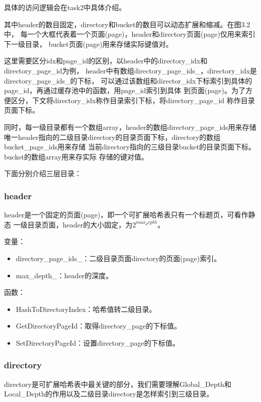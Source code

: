 \documentclass[a4paper]{article}
\begin{document}
具体的访问逻辑会在task2中具体介绍。

其中header的数目固定，directory和bucket的数目可以动态扩展和缩减。在图3.2中，
每一个大框代表着一个页面(page)，header和directory页面(page)仅用来索引下一级目录，
bucket页面(page)用来存储实际键值对。

这里需要区分idx和page\_id的区别，以header中的directory\_idx和directory\_page\_id为例，
header中有数组directory\_page\_ids\_，directory\_idx是directory\_page\_ids\_的下标，
可以通过该数组和director\_idx下标索引到具体的page\_id，再通过缓存池中的函数，用page\_id索引到具体
到页面(page)。为了方便区分，下文将directory\_idx称作目录索引下标，将directory\_page\_id
称作目录页面下标。

同时，每一级目录都有一个数组array，header的数组directory\_page\_ids用来存储
唯一header指向的二级目录directory的目录页面下标，directory的数组bucket\_page\_ids用来存储
当前directory指向的三级目录bucket的目录页面下标。bucket的数组array用来存实际
存储的键对值。

下面分别介绍三层目录：

\subsubsection{header}

header是一个固定的页面(page)，即一个可扩展哈希表只有一个标题页，可看作静态
一级目录页面，header的大小固定，为$2^{max_depth}$。

变量：
\begin{itemize}
   \item directory\_page\_ids\_：二级目录页面directory的页面(page)索引。
   \item max\_depth\_：header的深度。
\end{itemize}

函数：

\begin{itemize}
   \item HashToDirectoryIndex：哈希值转二级目录。
   \item GetDirectoryPageId：取得directory\_page的下标值。
   \item SetDirectoryPageId：设置directory\_page的下标值。
\end{itemize}

\subsubsection{directory}

directory是可扩展哈希表中最关键的部分，我们需要理解Global\_Depth和
Local\_Depth的作用以及二级目录directory是怎样索引到三级目录。
\end{document}
